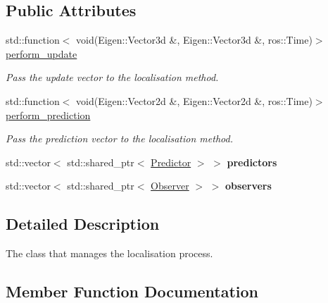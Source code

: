 \subsection*{Public Attributes}
\begin{DoxyCompactItemize}
\item 
\mbox{\label{classLocaliser_af141bf48f966e07742ce51ebb2342544}} 
std\+::function$<$ void(Eigen\+::\+Vector3d \&, Eigen\+::\+Vector3d \&, ros\+::\+Time)$>$ \hyperlink{classLocaliser_af141bf48f966e07742ce51ebb2342544}{perform\+\_\+update}
\begin{DoxyCompactList}\small\item\em Pass the update vector to the localisation method. \end{DoxyCompactList}\item 
\mbox{\label{classLocaliser_a2a03c3f46992c40b22e96651fa431e3b}} 
std\+::function$<$ void(Eigen\+::\+Vector2d \&, Eigen\+::\+Vector2d \&, ros\+::\+Time)$>$ \hyperlink{classLocaliser_a2a03c3f46992c40b22e96651fa431e3b}{perform\+\_\+prediction}
\begin{DoxyCompactList}\small\item\em Pass the prediction vector to the localisation method. \end{DoxyCompactList}\item 
\mbox{\label{classLocaliser_ad4afb745feaf02272efa67b5d99dface}} 
std\+::vector$<$ std\+::shared\+\_\+ptr$<$ \hyperlink{classPredictor}{Predictor} $>$ $>$ {\bfseries predictors}
\item 
\mbox{\label{classLocaliser_a7eadebb6cc19d5fa8277c8edf90cc325}} 
std\+::vector$<$ std\+::shared\+\_\+ptr$<$ \hyperlink{classObserver}{Observer} $>$ $>$ {\bfseries observers}
\end{DoxyCompactItemize}


\subsection{Detailed Description}
The class that manages the localisation process. 

\subsection{Member Function Documentation}
\mbox{\label{classLocaliser_abade968177dc4e68313125ef2bd57756}} 
